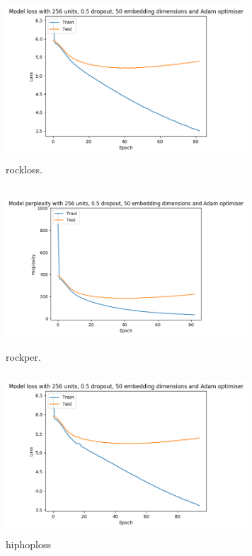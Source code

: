 \begin{figure}[h]
	\includegraphics[width=9cm, height=6cm]{./figures/rockloss}
	\centering
	\caption{rockloss.}
	\label{fig:poploss}
\end{figure}

\begin{figure}[h]
	\includegraphics[width=9cm, height=6cm]{./figures/rockper}
	\centering
	\caption{rockper.}
	\label{fig:popper}
\end{figure}

\begin{figure}[h]
	\includegraphics[width=9cm, height=6cm]{./figures/hiphoploss}
	\centering
	\caption{hiphoploss}
	\label{fig:poploss}
\end{figure}

